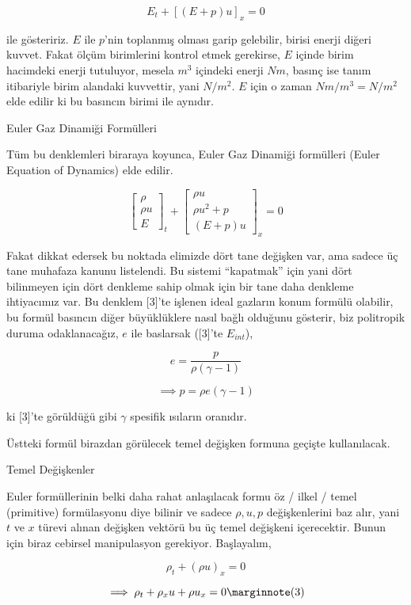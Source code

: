 \documentclass[12pt,fleqn]{article}\usepackage{../../common}
\begin{document}
$$
E_t + [(E + p) u ]_x = 0
$$

ile gösteririz. $E$ ile $p$'nin toplanmış olması garip gelebilir, birisi enerji
diğeri kuvvet. Fakat ölçüm birimlerini kontrol etmek gerekirse, $E$ içinde birim
hacimdeki enerji tutuluyor, mesela $m^3$ içindeki enerji $N m$, basınç ise tanım
itibariyle birim alandaki kuvvettir, yani $N / m^2$. $E$ için o zaman
$N m / m^3 = N / m^2$ elde edilir ki bu basıncın birimi ile aynıdır.

Euler Gaz Dinamiği Formülleri

Tüm bu denklemleri biraraya koyunca, Euler Gaz Dinamiği formülleri (Euler
Equation of Dynamics) elde edilir.

$$
\left[\begin{array}{c}
\rho \\ \rho u  \\ E
\end{array}\right]_t
+
\left[\begin{array}{c}
\rho u \\ \rho u^2 + p \\ (E+p) u 
\end{array}\right]_x 
= 0
$$

Fakat dikkat edersek bu noktada elimizde dört tane değişken var, ama sadece üç
tane muhafaza kanunu listelendi. Bu sistemi ``kapatmak'' için yani dört
bilinmeyen için dört denkleme sahip olmak için bir tane daha denkleme
ihtiyacımız var. Bu denklem [3]'te işlenen ideal gazların konum formülü
olabilir, bu formül basıncın diğer büyüklüklere nasıl bağlı olduğunu gösterir,
biz politropik duruma odaklanacağız, $e$ ile baslarsak ([3]'te $E_{int}$),

$$
e = \frac{p}{\rho (\gamma - 1)}
$$

$$
\implies p = \rho e (\gamma - 1)
$$

ki [3]'te görüldüğü gibi $\gamma$ spesifik ısıların oranıdır.

Üstteki formül birazdan görülecek temel değişken formuna geçişte kullanılacak.

Temel Değişkenler

Euler formüllerinin belki daha rahat anlaşılacak formu öz / ilkel / temel
(primitive) formülasyonu diye bilinir ve sadece $\rho,u,p$ değişkenlerini baz
alır, yani $t$ ve $x$ türevi alınan değişken vektörü bu üç temel değişkeni
içerecektir. Bunun için biraz cebirsel manipulasyon gerekiyor. Başlayalım,

$$
\rho_t + (\rho u)_x = 0 
$$

$$
\implies \rho_t + \rho_x u + \rho u_x = 0
\mlabel{3}
$$
\end{document}
